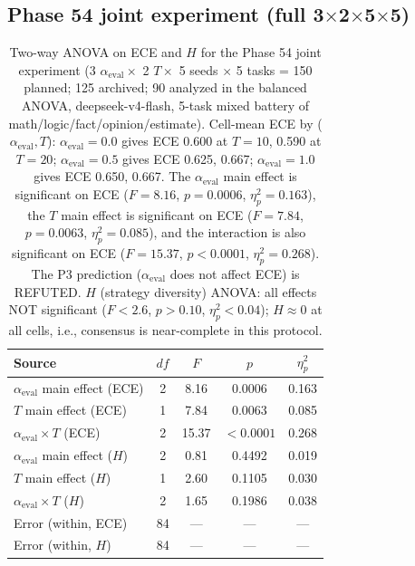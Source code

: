 \documentclass[11pt]{article}
\begin{document}
\subsection*{Phase 54 joint experiment (full 3$\times$2$\times$5$\times$5)}
\begin{table}[h]
\centering
\caption{Two-way ANOVA on ECE and $H$ for the Phase 54 joint experiment (3 $\alpha_{\text{eval}} \times$ 2 $T \times$ 5 seeds $\times$ 5 tasks = 150 planned; 125 archived; 90 analyzed in the balanced ANOVA, deepseek-v4-flash, 5-task mixed battery of math/logic/fact/opinion/estimate). Cell-mean ECE by ($\alpha_{\text{eval}}, T$): $\alpha_{\text{eval}}{=}0.0$ gives ECE 0.600 at $T{=}10$, 0.590 at $T{=}20$; $\alpha_{\text{eval}}{=}0.5$ gives ECE 0.625, 0.667; $\alpha_{\text{eval}}{=}1.0$ gives ECE 0.650, 0.667. The $\alpha_{\text{eval}}$ main effect is significant on ECE ($F = 8.16$, $p = 0.0006$, $\eta^2_p = 0.163$), the $T$ main effect is significant on ECE ($F = 7.84$, $p = 0.0063$, $\eta^2_p = 0.085$), and the interaction is also significant on ECE ($F = 15.37$, $p < 0.0001$, $\eta^2_p = 0.268$). The P3 prediction ($\alpha_{\text{eval}}$ does not affect ECE) is REFUTED. $H$ (strategy diversity) ANOVA: all effects NOT significant ($F < 2.6$, $p > 0.10$, $\eta^2_p < 0.04$); $H \approx 0$ at all cells, i.e., consensus is near-complete in this protocol.}
\label{tab:joint_full_v10}
\begin{tabular}{@{}lcccc@{}}
\toprule
\textbf{Source} & \textbf{$df$} & \textbf{$F$} & \textbf{$p$} & \textbf{$\eta^2_p$} \\
\midrule
$\alpha_{\text{eval}}$ main effect (ECE) & 2 & 8.16 & 0.0006 & 0.163 \\
$T$ main effect (ECE) & 1 & 7.84 & 0.0063 & 0.085 \\
$\alpha_{\text{eval}} \times T$ (ECE) & 2 & 15.37 & $< 0.0001$ & 0.268 \\
\midrule
$\alpha_{\text{eval}}$ main effect ($H$) & 2 & 0.81 & 0.4492 & 0.019 \\
$T$ main effect ($H$) & 1 & 2.60 & 0.1105 & 0.030 \\
$\alpha_{\text{eval}} \times T$ ($H$) & 2 & 1.65 & 0.1986 & 0.038 \\
\midrule
Error (within, ECE) & 84 & --- & --- & --- \\
Error (within, $H$) & 84 & --- & --- & --- \\
\bottomrule
\end{tabular}
\end{table}
\end{document}
